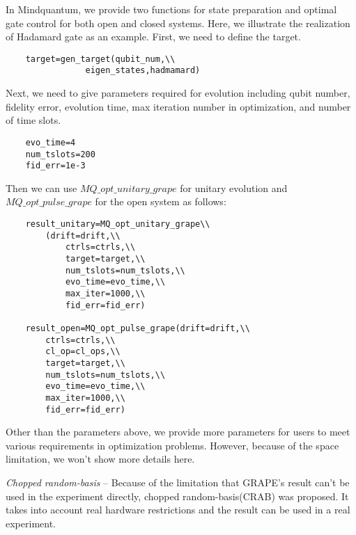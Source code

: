 In Mindquantum, we provide two functions for state preparation and optimal gate control for both open and closed systems. Here, we illustrate the realization of Hadamard gate as an example. First, we need to define the target.
\begin{lstlisting}
    target=gen_target(qubit_num,\\
                eigen_states,hadmamard)
\end{lstlisting}
Next, we need to give parameters required for evolution including qubit number, fidelity error, evolution time, max iteration number in optimization, and number of time slots.
\begin{lstlisting}
    evo_time=4
    num_tslots=200
    fid_err=1e-3
\end{lstlisting}
Then we can use $MQ\_opt\_unitary\_grape$ for unitary evolution and $MQ\_opt\_pulse\_grape$ for the open system as follows:
\begin{lstlisting}
    result_unitary=MQ_opt_unitary_grape\\
        (drift=drift,\\
            ctrls=ctrls,\\
            target=target,\\
            num_tslots=num_tslots,\\
            evo_time=evo_time,\\
            max_iter=1000,\\
            fid_err=fid_err)

    result_open=MQ_opt_pulse_grape(drift=drift,\\
        ctrls=ctrls,\\
        cl_op=cl_ops,\\
        target=target,\\
        num_tslots=num_tslots,\\
        evo_time=evo_time,\\
        max_iter=1000,\\
        fid_err=fid_err)
\end{lstlisting}
Other than the parameters above, we provide more parameters for users to meet various requirements in optimization problems. However, because of the space limitation, we won't show more details here. 

\textit{Chopped random-basis} -- Because of the limitation that GRAPE's result can't be used in the experiment directly, chopped random-basis(CRAB) was proposed. It takes into account real hardware restrictions and the result can be used in a real experiment.

